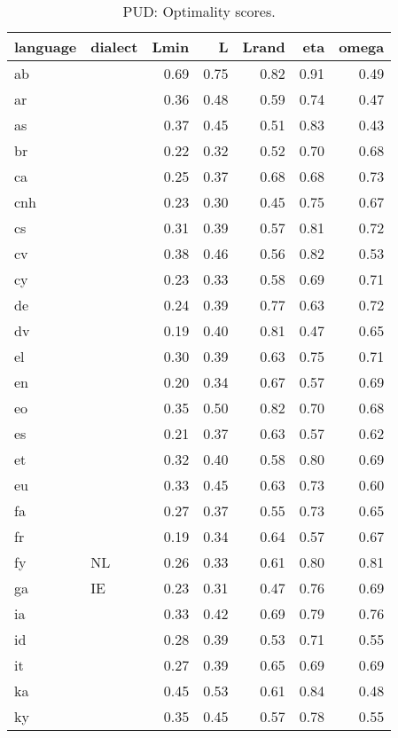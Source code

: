 \begin{table}[H]
\centering
\caption{PUD: Optimality scores.} 
\label{tab:opt_scores_cv}
\begin{tabular}{llrrrrr}
  \hline
language & dialect & Lmin & L & Lrand & eta & omega \\ 
  \hline
ab &  & 0.69 & 0.75 & 0.82 & 0.91 & 0.49 \\ 
  ar &  & 0.36 & 0.48 & 0.59 & 0.74 & 0.47 \\ 
  as &  & 0.37 & 0.45 & 0.51 & 0.83 & 0.43 \\ 
  br &  & 0.22 & 0.32 & 0.52 & 0.70 & 0.68 \\ 
  ca &  & 0.25 & 0.37 & 0.68 & 0.68 & 0.73 \\ 
  cnh &  & 0.23 & 0.30 & 0.45 & 0.75 & 0.67 \\ 
  cs &  & 0.31 & 0.39 & 0.57 & 0.81 & 0.72 \\ 
  cv &  & 0.38 & 0.46 & 0.56 & 0.82 & 0.53 \\ 
  cy &  & 0.23 & 0.33 & 0.58 & 0.69 & 0.71 \\ 
  de &  & 0.24 & 0.39 & 0.77 & 0.63 & 0.72 \\ 
  dv &  & 0.19 & 0.40 & 0.81 & 0.47 & 0.65 \\ 
  el &  & 0.30 & 0.39 & 0.63 & 0.75 & 0.71 \\ 
  en &  & 0.20 & 0.34 & 0.67 & 0.57 & 0.69 \\ 
  eo &  & 0.35 & 0.50 & 0.82 & 0.70 & 0.68 \\ 
  es &  & 0.21 & 0.37 & 0.63 & 0.57 & 0.62 \\ 
  et &  & 0.32 & 0.40 & 0.58 & 0.80 & 0.69 \\ 
  eu &  & 0.33 & 0.45 & 0.63 & 0.73 & 0.60 \\ 
  fa &  & 0.27 & 0.37 & 0.55 & 0.73 & 0.65 \\ 
  fr &  & 0.19 & 0.34 & 0.64 & 0.57 & 0.67 \\ 
  fy & NL & 0.26 & 0.33 & 0.61 & 0.80 & 0.81 \\ 
  ga & IE & 0.23 & 0.31 & 0.47 & 0.76 & 0.69 \\ 
  ia &  & 0.33 & 0.42 & 0.69 & 0.79 & 0.76 \\ 
  id &  & 0.28 & 0.39 & 0.53 & 0.71 & 0.55 \\ 
  it &  & 0.27 & 0.39 & 0.65 & 0.69 & 0.69 \\ 
  ka &  & 0.45 & 0.53 & 0.61 & 0.84 & 0.48 \\ 
  ky &  & 0.35 & 0.45 & 0.57 & 0.78 & 0.55 \\ 

\end{tabular}
\end{table}
